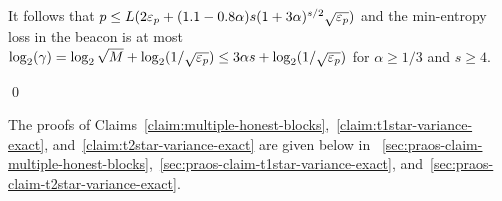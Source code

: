 It follows that 
$p \leq L (2 \mathsf{\varepsilon}_p + (1.1 - 0.8 \alpha) s (1+3\alpha)^{s/2} \sqrt{\mathsf{\varepsilon}_p} )$ 
and 
the min-entropy loss in the beacon is at most 
$
  \log_2(\gamma) 
  = \log_2 \sqrt{M} + \log_2(1/\sqrt{\mathsf{\varepsilon}_p})
  \leq 3 \alpha s + \log_2(1/\sqrt{\mathsf{\varepsilon}_p}) 
$ 
for $\alpha \geq 1/3$ and $s \geq 4$. 









\hfill\qed

The proofs of Claims~\ref{claim:multiple-honest-blocks},~\ref{claim:t1star-variance-exact}, 
and~\ref{claim:t2star-variance-exact} 
are given below in \Section~\ref{sec:praos-claim-multiple-honest-blocks},~\ref{sec:praos-claim-t1star-variance-exact}, and~\ref{sec:praos-claim-t2star-variance-exact}.




